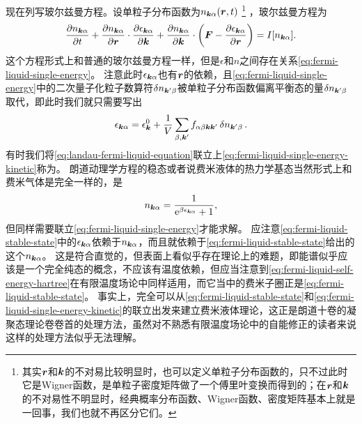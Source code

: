 现在列写玻尔兹曼方程。设单粒子分布函数为$n_{\vb*{k} \alpha}(\vb*{r}, t)$%
\footnote{
    其实$\vb*{r}$和$\vb*{k}$的不对易比较明显时，也可以定义单粒子分布函数的，只不过此时它是Wigner函数，是单粒子密度矩阵做了一个傅里叶变换而得到的；在$\vb*{r}$和$\vb*{k}$的不对易性不明显时，经典概率分布函数、Wigner函数、密度矩阵基本上就是一回事，我们也就不再区分它们。
}%
，玻尔兹曼方程为
\begin{equation}
    \pdv{n_{\vb*{k} \alpha}}{t} + \pdv{n_{\vb*{k} \alpha}}{\vb*{r}} \cdot \pdv{\epsilon_{\vb*{k} \alpha}}{\vb*{k}} + \pdv{n_{\vb*{k} \alpha}}{\vb*{k}} \cdot \left( \vb*{F} - \pdv{\epsilon_{\vb*{k} \alpha}}{\vb*{r}} \right) = I[n_{\vb*{k} \alpha}]. 
    \label{eq:landau-fermi-liquid-equation}
\end{equation}
这个方程形式上和普通的玻尔兹曼方程一样，但是$\epsilon$和$n$之间存在关系\eqref{eq:fermi-liquid-single-energy}。
注意此时$\epsilon_{\vb*{k} \alpha}$也有$\vb*{r}$的依赖，且\eqref{eq:fermi-liquid-single-energy}中的二次量子化粒子数算符$\var{n_{\vb*{k}' \beta}}$被单粒子分布函数偏离平衡态的量$\var{n_{\vb*{k}' \beta}}$取代，即此时我们就只需要写出
\begin{equation}
    \epsilon_{\vb*{k} \alpha} = \epsilon_{\vb*{k}}^0 + \frac{1}{V} \sum_{\beta, \vb*{k}'} f_{\alpha \beta \vb*{k} \vb*{k}'} \var{n_{\vb*{k}' \beta}}.
    \label{eq:fermi-liquid-single-energy-kinetic}
\end{equation}
有时我们将\eqref{eq:landau-fermi-liquid-equation}联立上\eqref{eq:fermi-liquid-single-energy-kinetic}称为。
朗道动理学方程的稳态或者说费米液体的热力学基态当然形式上和费米气体是完全一样的，是
\begin{equation}
    n_{\vb*{k} \alpha} = \frac{1}{\mathrm{e}^{\beta \epsilon_{\vb*{k} \alpha}} + 1},
    \label{eq:fermi-liquid-stable-state}
\end{equation}
但同样需要联立\eqref{eq:fermi-liquid-single-energy}才能求解。
应注意\eqref{eq:fermi-liquid-stable-state}中的$\epsilon_{\vb*{k} \alpha}$依赖于$n_{\vb*{k} \alpha}$，而且就依赖于\eqref{eq:fermi-liquid-stable-state}给出的这个$n_{\vb*{k} \alpha}$。
这是符合直觉的，但表面上看似乎存在理论上的难题，即能谱似乎应该是一个完全纯态的概念，不应该有温度依赖，但应当注意到\eqref{eq:fermi-liquid-self-energy-hartree}在有限温度场论中同样适用，而它当中的费米子圈正是\eqref{eq:fermi-liquid-stable-state}。
事实上，完全可以从\eqref{eq:fermi-liquid-stable-state}和\eqref{eq:fermi-liquid-single-energy-kinetic}的联立出发来建立费米液体理论，这正是朗道十卷的凝聚态理论卷卷首的处理方法，虽然对不熟悉有限温度场论中的自能修正的读者来说这样的处理方法似乎无法理解。

